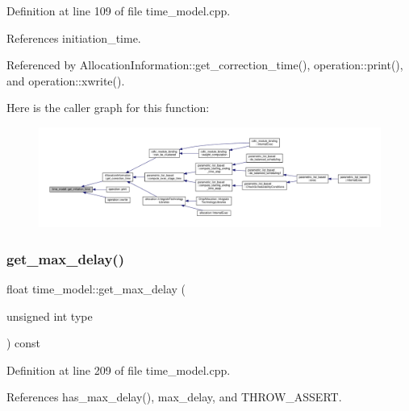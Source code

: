 Definition at line 109 of file time\+\_\+model.\+cpp.



References initiation\+\_\+time.



Referenced by Allocation\+Information\+::get\+\_\+correction\+\_\+time(), operation\+::print(), and operation\+::xwrite().

Here is the caller graph for this function\+:
\nopagebreak
\begin{figure}[H]
\begin{center}
\leavevmode
\includegraphics[width=350pt]{d3/d73/classtime__model_a25614ecc690c443f3aab565a3db610f3_icgraph}
\end{center}
\end{figure}
\mbox{\label{classtime__model_ad5c3137763e7080054586c28cdfb8627}} 
\subsubsection{\texorpdfstring{get\+\_\+max\+\_\+delay()}{get\_max\_delay()}}
{\footnotesize\ttfamily float time\+\_\+model\+::get\+\_\+max\+\_\+delay (\begin{DoxyParamCaption}\item[{unsigned int}]{type }\end{DoxyParamCaption}) const}



Definition at line 209 of file time\+\_\+model.\+cpp.



References has\+\_\+max\+\_\+delay(), max\+\_\+delay, and T\+H\+R\+O\+W\+\_\+\+A\+S\+S\+E\+RT.

